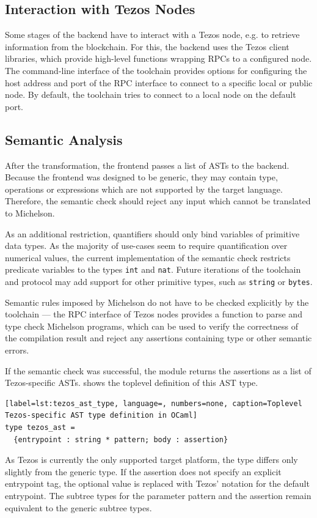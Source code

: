 \subsection{Interaction with Tezos Nodes}
Some stages of the backend have to interact with a Tezos node, e.g. to retrieve information from the blockchain. For this, the backend uses the Tezos client libraries, which provide high-level functions wrapping RPCs to a configured node. The command-line interface of the toolchain provides options for configuring the host address and port of the RPC interface to connect to a specific local or public node. By default, the toolchain tries to connect to a local node on the default port.

\subsection{Semantic Analysis}
After the transformation, the frontend passes a list of ASTs to the backend. Because the frontend was designed to be generic, they may contain type, operations or expressions which are not supported by the target language. Therefore, the semantic check should reject any input which cannot be translated to Michelson.

As an additional restriction, quantifiers should only bind variables of primitive data types. As the majority of use-cases seem to require quantification over numerical values, the current implementation of the semantic check restricts predicate variables to the types \texttt{int} and \texttt{nat}. Future iterations of the toolchain and protocol may add support for other primitive types, such as \texttt{string} or \texttt{bytes}.

Semantic rules imposed by Michelson do not have to be checked explicitly by the toolchain --- the RPC interface of Tezos nodes provides a function to parse and type check Michelson programs, which can be used to verify the correctness of the compilation result and reject any assertions containing type or other semantic errors.

If the semantic check was successful, the module returns the assertions as a list of Tezos-specific ASTs.  shows the toplevel definition of this AST type.
\begin{lstlisting}[label=lst:tezos_ast_type, language=, numbers=none, caption=Toplevel Tezos-specific AST type definition in OCaml]
type tezos_ast =
  {entrypoint : string * pattern; body : assertion}
\end{lstlisting}
As Tezos is currently the only supported target platform, the type differs only slightly from the generic type. If the assertion does not specify an explicit entrypoint tag, the optional value is replaced with Tezos' notation for the default entrypoint. The subtree types for the parameter pattern and the assertion remain equivalent to the generic subtree types.

